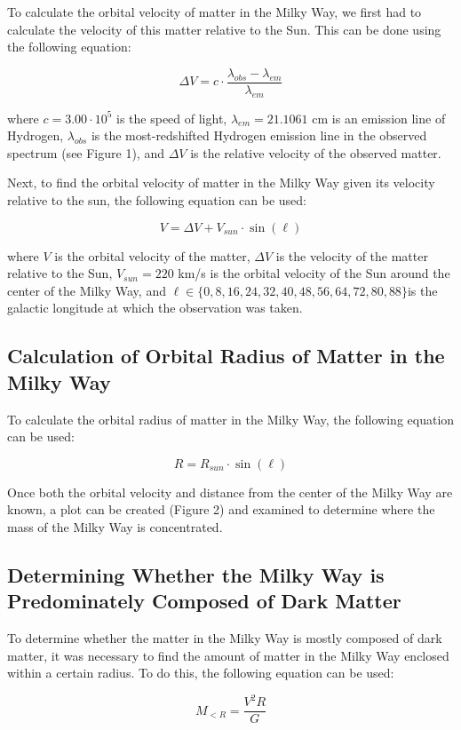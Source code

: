 \documentclass{article}
\begin{document}
To calculate the orbital velocity of matter in the Milky Way, we first had to calculate the velocity of this matter relative to the Sun.
This can be done using the following equation:

\[
\Delta V = c \cdot \frac{\lambda_{obs} - \lambda_{em}}{\lambda_{em}}
\]

where $c = 3.00 \cdot 10^5$ is the speed of light, $\lambda_{em} = 21.1061$ cm is an emission line of Hydrogen, $\lambda_{obs}$ is the most-redshifted Hydrogen emission line in the observed spectrum (see Figure 1), and $\Delta V$ is the relative velocity of the observed matter.

Next, to find the orbital velocity of matter in the Milky Way given its velocity relative to the sun, the following equation can be used:

\[
V = \Delta V + V_{sun} \cdot \sin(\ell)
\]

where $V$ is the orbital velocity of the matter, $\Delta V$ is the velocity of the matter relative to the Sun, $V_{sun} = 220$ km/s is the orbital velocity of the Sun around the center of the Milky Way, and $\ell \in \{0, 8, 16, 24, 32, 40, 48, 56, 64, 72, 80, 88\}$\degree \space is the galactic longitude at which the observation was taken.

\subsection{Calculation of Orbital Radius of Matter in the Milky Way}

To calculate the orbital radius of matter in the Milky Way, the following equation can be used:

\[
R = R_{sun} \cdot \sin (\ell)
\]

Once both the orbital velocity and distance from the center of the Milky Way are known, a plot can be created (Figure 2) and examined to determine where the mass of the Milky Way is concentrated.

\subsection{Determining Whether the Milky Way is Predominately Composed of Dark Matter}

To determine whether the matter in the Milky Way is mostly composed of dark matter, it was necessary to find the amount of matter in the Milky Way enclosed within a certain radius.
To do this, the following equation can be used:

\[
M_{<R} = \frac{V^2R}{G}
\]
\end{document}
